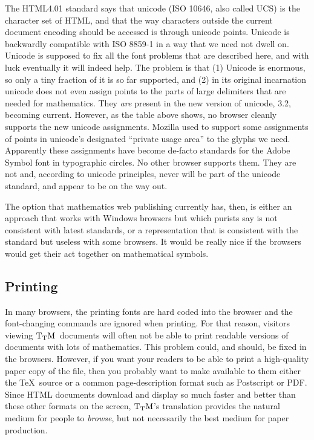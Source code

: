\documentclass[12pt]{article}
\def\TtM{$\rm{}T_TH$}
\def\TtM{$\rm{}T_TM$}%
\begin{document}
The HTML4.01 standard says that unicode (ISO 10646, also called UCS) is
the character set of HTML, and that the way characters outside the
current document encoding should be accessed is through unicode
points. Unicode is backwardly compatible with ISO 8859-1 in a way that
we need not dwell on. Unicode is supposed to fix all the font problems
that are described here, and with luck eventually it will indeed
help. The problem is that (1) Unicode is enormous, so only a tiny
fraction of it is so far supported, and (2) in its original incarnation
unicode does not even assign points to the parts of large delimiters
that are needed for mathematics. They \emph{are} present in the new
version of unicode, 3.2, becoming current. However, as the
table above shows, no browser cleanly supports the new unicode
assignments. Mozilla used to support some assignments of points in
unicode's designated ``private usage area'' to the glyphs we
need. Apparently these assignments have become de-facto standards for
the Adobe Symbol font in typographic circles. No other browser
supports them. They are not and, according to unicode principles,
never will be part of the unicode standard, and appear to be on the
way out.

The option that mathematics web publishing currently has, then, is
 either an approach that works with Windows browsers but which purists
 say is not consistent with latest standards, or a representation that
 is consistent with the standard but useless with some browsers. It
would be really nice if the browsers would get their act together on
mathematical symbols.

\subsection{Printing}
\label{exploder}

In many browsers, the printing fonts are hard coded into the browser
and the font-changing commands are ignored when printing. For that
reason, visitors viewing \TtM\ documents will often not be able to
print readable versions of documents with lots of mathematics. This
problem could, and should, be fixed in the browsers. However, if you
want your readers to be able to print a high-quality paper copy of the
file, then you probably want to make available to them either the
\TeX\ source or a common page-description format such as Postscript or
PDF. Since HTML documents download and display so much faster and
better than these other formats on the screen, \TtM's translation
provides the natural medium for people to {\it browse}, but not
necessarily the best medium for paper production.
\end{document}
